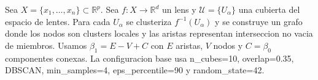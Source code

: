Sea $X = \{x_1, \ldots, x_n\} \subset \mathbb{R}^p$. Sea $f: X \to \mathbb{R}^d$ un lens y $\mathcal{U}=\{U_\alpha\}$ una cubierta del espacio de lentes. Para cada $U_\alpha$ se clusteriza $f^{-1}(U_\alpha)$ y se construye un grafo donde los nodos son clusters locales y las aristas representan interseccion no vacia de miembros. Usamos $\beta_1 = E - V + C$ con $E$ aristas, $V$ nodos y $C=\beta_0$ componentes conexas. La configuracion base usa n\_cubes=10, overlap=0.35, DBSCAN, min\_samples=4, eps\_percentile=90 y random\_state=42.
